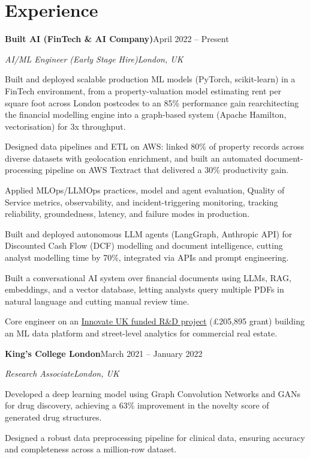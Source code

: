 \documentclass[10pt,a4paper]{article}
\newcommand{\entry}[4]{%
  {\color{company}\bfseries #1}\hfill {\color{muted}#2}\par
  \vspace{1pt}
  {\itshape #3}\hfill {\color{muted}\itshape #4}\par
  \vspace{3pt}%
}
\begin{document}
\section{Experience}
\entry{Built AI (FinTech \& AI Company)}{April 2022 -- Present}{AI/ML Engineer (Early Stage Hire)}{London, UK}
\begin{tight}
  \item Built and deployed scalable production ML models (PyTorch, scikit-learn) in a FinTech environment, from a property-valuation model estimating rent per square foot across London postcodes to an 85\% performance gain rearchitecting the financial modelling engine into a graph-based system (Apache Hamilton, vectorisation) for 3x throughput.
  \item Designed data pipelines and ETL on AWS: linked 80\% of property records across diverse datasets with geolocation enrichment, and built an automated document-processing pipeline on AWS Textract that delivered a 30\% productivity gain.
  \item Applied MLOps/LLMOps practices, model and agent evaluation, Quality of Service metrics, observability, and incident-triggering monitoring, tracking reliability, groundedness, latency, and failure modes in production.
  \item Built and deployed autonomous LLM agents (LangGraph, Anthropic API) for Discounted Cash Flow (DCF) modelling and document intelligence, cutting analyst modelling time by 70\%, integrated via APIs and prompt engineering.
  \item Built a conversational AI system over financial documents using LLMs, RAG, embeddings, and a vector database, letting analysts query multiple PDFs in natural language and cutting manual review time.
  \item Core engineer on an \href{https://gtr.ukri.org/projects?ref=10022996}{Innovate UK funded R\&D project} (\pounds205,895 grant) building an ML data platform and street-level analytics for commercial real estate.
\end{tight}

\entry{King's College London}{March 2021 -- January 2022}{Research Associate}{London, UK}
\begin{tight}
  \item Developed a deep learning model using Graph Convolution Networks and GANs for drug discovery, achieving a 63\% improvement in the novelty score of generated drug structures.
  \item Designed a robust data preprocessing pipeline for clinical data, ensuring accuracy and completeness across a million-row dataset.
\end{tight}
\end{document}
